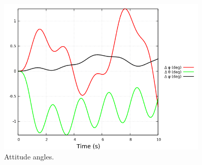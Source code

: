 \documentclass{article}
\begin{document}
\begin{figure}[h]
    \centering
    \includegraphics[width=0.9\textwidth]{sim_results_phi_theta_psi.png}
    \caption{Attitude angles.}
    \label{Fig:Attitude}
\end{figure}




\end{document}
